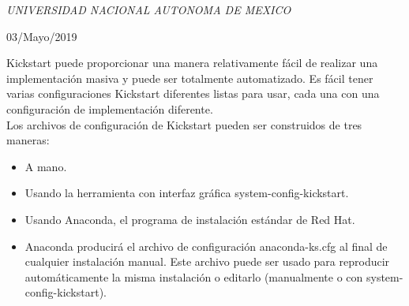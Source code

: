 \documentclass[a4paper, 11pt, oneside]{article}
\begin{document}
\begin{titlepage}
	\textit{UNIVERSIDAD NACIONAL AUTONOMA DE MEXICO} 
	
	\vfill
	
	
	
	
	\vspace{0.3\baselineskip} 
	
	03/Mayo/2019 
	
	

\end{titlepage}
Kickstart puede proporcionar una manera relativamente fácil de realizar una implementación masiva y puede ser totalmente automatizado. Es fácil tener varias configuraciones Kickstart diferentes listas para usar, cada una con una configuración de implementación diferente.\\
Los archivos de configuración de Kickstart pueden ser construidos de tres maneras:
\begin{itemize}
    \item A mano.
    \item Usando la herramienta con interfaz gráfica system-config-kickstart.
    \item Usando Anaconda, el programa de instalación estándar de Red Hat.
    \item Anaconda producirá el archivo de configuración anaconda-ks.cfg al final de cualquier instalación manual. Este archivo puede ser usado para reproducir automáticamente la misma instalación o editarlo (manualmente o con system-config-kickstart).

\end{itemize}
\end{document}
